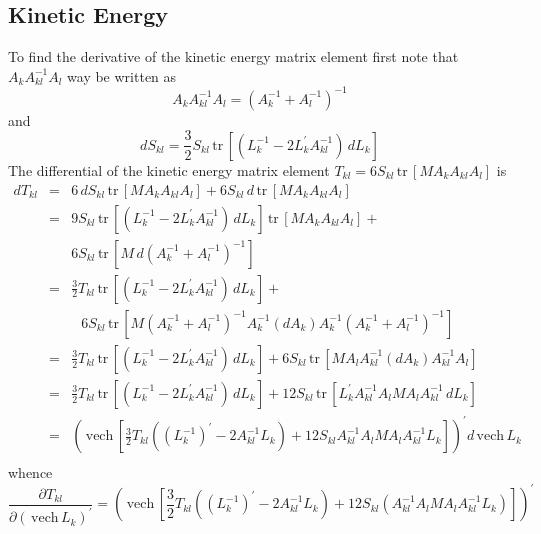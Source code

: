 \documentclass[12pt,thmsa,suthesis,verbatim]{report}
\begin{document}
\subsection{Kinetic Energy}

To find the derivative of the kinetic energy matrix element first note that $%
A_kA_{kl}^{-1}A_l$ way be written as 
\begin{equation}
A_kA_{kl}^{-1}A_l=\left( A_k^{-1}+A_l^{-1}\right) ^{-1}
\end{equation}
and 
\begin{equation}
dS_{kl}=\frac 32S_{kl}\,\mathrm{tr}\,\left[ \left( L_k^{-1}-2L_k^{\prime
}A_{kl}^{-1}\right) \,dL_k\right]
\end{equation}
The differential of the kinetic energy matrix element $T_{kl}=6S_{kl}\,%
\mathrm{tr}\,\left[ MA_kA_{kl}A_l\right] $ is 
\begin{eqnarray}
dT_{kl} &=&6\,dS_{kl}\,\mathrm{tr}\,\left[ MA_kA_{kl}A_l\right] +6S_{kl}\,d\,%
\mathrm{tr}\,\left[ MA_kA_{kl}A_l\right]  \nonumber \\
\ &=&9S_{kl}\,\mathrm{tr}\,\left[ \left( L_k^{-1}-2L_k^{\prime
}A_{kl}^{-1}\right) \,dL_k\right] \,\mathrm{tr}\,\left[ MA_kA_{kl}A_l\right]
+  \nonumber \\
&&6S_{kl}\,\mathrm{tr}\,\left[ M\,d\left( A_k^{-1}+A_l^{-1}\right)
^{-1}\right]  \nonumber \\
\ &=&\frac 32T_{kl}\,\mathrm{tr}\,\left[ \left( L_k^{-1}-2L_k^{\prime
}A_{kl}^{-1}\right) \,dL_k\right] +  \nonumber \\
&&\ \,\,\,6S_{kl}\,\mathrm{tr}\,\left[ M\left( A_k^{-1}+A_l^{-1}\right)
^{-1}A_k^{-1}\left( dA_k\right) A_k^{-1}\left( A_k^{-1}+A_l^{-1}\right)
^{-1}\right]  \nonumber \\
\ &=&\frac 32T_{kl}\,\mathrm{tr}\,\left[ \left( L_k^{-1}-2L_k^{\prime
}A_{kl}^{-1}\right) \,dL_k\right] +6S_{kl}\,\mathrm{tr}\,\left[
MA_lA_{kl}^{-1}\left( dA_k\right) A_{kl}^{-1}A_l\right]  \nonumber \\
\ &=&\frac 32T_{kl}\,\mathrm{tr}\,\left[ \left( L_k^{-1}-2L_k^{\prime
}A_{kl}^{-1}\right) \,dL_k\right] +12S_{kl}\,\mathrm{tr}\,\left[ L_k^{\prime
}A_{kl}^{-1}A_lMA_lA_{kl}^{-1}\,dL_k\right]  \nonumber \\
\ &=&\left( \,\mathrm{vech}\,\left[ \frac 32T_{kl}\left( \left(
L_k^{-1}\right) ^{\prime }-2A_{kl}^{-1}L_k\right)
+12S_{kl}A_{kl}^{-1}A_lMA_lA_{kl}^{-1}L_k\right] \right) ^{\prime }d\,%
\mathrm{vech}\,L_k  \nonumber \\
&&\,\,
\end{eqnarray}
whence 
\begin{equation}
\frac{\partial T_{kl}}{\partial \left( \,\mathrm{vech}\,L_k\right) ^{\prime }%
}=\left( \,\mathrm{vech}\,\left[ \frac 32T_{kl}\left( \left( L_k^{-1}\right)
^{\prime }-2A_{kl}^{-1}L_k\right) +12S_{kl}\left(
A_{kl}^{-1}A_lMA_lA_{kl}^{-1}L_k\right) \right] \right) ^{\prime }
\end{equation}
\end{document}
